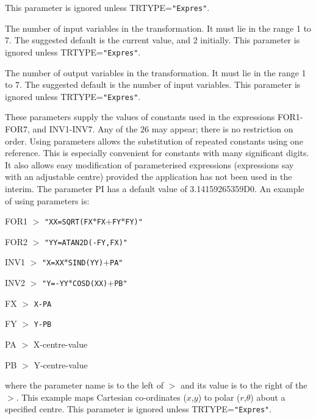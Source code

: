 \documentclass[twoside,11pt]{article}
\newcommand{\sstsubsection}[1]{ \item[{#1}] \mbox{} \\}
\renewcommand{\sstsubsection}[1]{\item[{#1}]}
\begin{document}
{{{         This parameter is ignored unless TRTYPE={\tt "Expres"}.
      }
      \sstsubsection{
         NVIN = \_INTEGER (Read)
      }{
         The number of input variables in the transformation.  It must
         lie in the range 1 to 7.  The suggested default is the current
         value, and 2 initially.   This parameter is ignored unless
         TRTYPE={\tt "Expres"}.
      }
      \sstsubsection{
         NVOUT = \_INTEGER (Read)
      }{
         The number of output variables in the transformation.  It must
         lie in the range 1 to 7.  The suggested default is the number
         of input variables.   This parameter is ignored unless
         TRTYPE={\tt "Expres"}.
      }
      \sstsubsection{
         PA-PZ = \_DOUBLE (Read)
      }{
         These parameters supply the values of constants used in the
         expressions FOR1-FOR7, and INV1-INV7.  Any of the 26 may
         appear; there is no restriction on order.  Using parameters
         allows the substitution of repeated constants using one
         reference.  This is especially convenient for constants with
         many significant digits.  It also allows easy modification of
         parameterised expressions (expressions say with an adjustable
         centre) provided the application has not been used in the
         interim.  The parameter PI has a default value of
         3.14159265359D0.  An example of using parameters is:
         \begin{description}
         \item FOR1 $>$ {\tt "XX=SQRT(FX$*$FX$+$FY$*$FY)"}
         \item FOR2 $>$ {\tt "YY=ATAN2D(-FY,FX)"}
         \item INV1 $>$ {\tt "X=XX$*$SIND(YY)$+$PA"}
         \item INV2 $>$ {\tt "Y=-YY$*$COSD(XX)$+$PB"}
         \item FX $>$ {\tt X-PA}
         \item FY $>$ {\tt Y-PB}
         \item PA $>$ X-centre-value
         \item PB $>$ Y-centre-value
         \end{description}
         where the parameter name is to the left of $>$ and its value is
         to the right of the $>$.  This example maps Cartesian
         co-ordinates ($x$,$y$) to polar ($r$,$\theta$) about a specified
         centre.
         This parameter is ignored unless TRTYPE={\tt "Expres"}.
      }
      \sstsubsection{
         PREC = LITERAL (Read)
      }{
}}}
\end{document}
